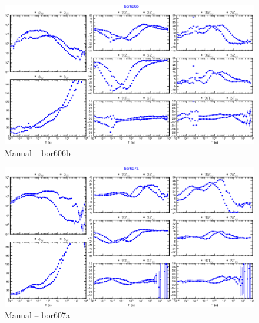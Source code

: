     \begin{figure}[H]
        \caption{Manual -- bor606b}
            \begin{center}
                \includegraphics[width=16cm]{texto/figura/sites/M-bor606b.png}
            \end{center}
    \end{figure}
    
    \begin{figure}[H]
        \caption{Manual -- bor607a}
            \begin{center}
                \includegraphics[width=16cm]{texto/figura/sites/M-bor607a.png}
            \end{center}
    \end{figure}
    

